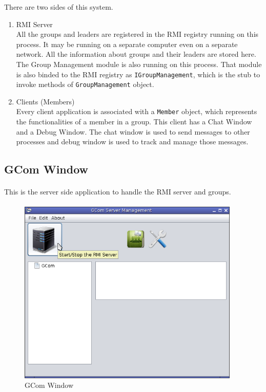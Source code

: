\documentclass[a4paper,english,twoside]{article}
\begin{document}
\vspace*{5mm}
\noindent
There are two sides of this system.

\begin{enumerate}
\item RMI Server\\
All the groups and leaders are registered in the RMI registry running on this process. It may be running on a separate computer even on a separate network. All the information about groups and their leaders are stored here. The Group Management module is also running on this process. That module is also binded to the RMI registry as \texttt{IGroupManagement}, which is the stub to invoke methods of \texttt{GroupManagement} object.

\item Clients (Members)\\
Every client application is associated with a \texttt{Member} object, which represents the functionalities of a member in a group. This client has a Chat Window and a Debug Window. The chat window is used to send messages to other processes and debug window is used to track and manage those messages.
\end{enumerate}

\subsection{GCom Window}
\paragraph{}
This is the server side application to handle the RMI server and groups.

\paragraph{}
\begin{figure}[h]
\begin{center}
\includegraphics[width=400px]{GCom-1.png}
\caption{GCom Window}
\end{center}
\end{figure}
\end{document}
